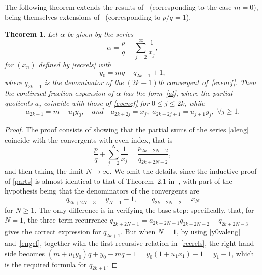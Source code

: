\documentclass[10pt, a4paper]{amsart}
\numberwithin{equation}{section}
\newcommand\al{{\alpha}}
\theoremstyle{plain}
\newtheorem{thm}{Theorem}[section]
\theoremstyle{definition}
\begin{document}
The following theorem extends the results of~\cite{Hone3} (corresponding to the case $m=0$), 
being themselves extensions of~\cite{Hone1} (corresponding to $p/q=1$). 

\begin{thm} 
\label{engelthm}
Let $\al$ be given by the series  
\begin{equation} 
\label{aleng} 
\al = \frac{p}{q}+\sum_{j=2}^\infty \frac{1}{x_j}, 
\end{equation} 
for $(x_n)$ defined by \eqref{recrels} with 
\begin{equation}
\label{y0valeng}
y_0=mq+q_{2k-1}+1, 
\end{equation} 
where $q_{2k-1}$ is the denominator of the $(2k-1)$th convergent of~\eqref{evencf}. 
Then the continued fraction expansion of $\al$ has the form~\eqref{al}, 
where the partial quotients $a_j$ coincide with those of 
\eqref{evencf} for $0\leq j\leq 2k$, while  
\begin{equation}
\label{engcf}
a_{2k+1}=m+u_1 y_0, \quad and \quad
a_{2k+2j}=x_j, \, \, a_{2k+2j+1}=u_{j+1}y_j, \,\, 
\forall j\geq 1.
\end{equation} 
\end{thm} 

\begin{proof} 
The proof  consists of showing that the partial sums of the series \eqref{aleng} 
coincide with the convergents with even index, that is 
\begin{equation}
\label{parts} 
\frac{p}{q}+\sum_{j=2}^{N}\frac{1}{x_j} = \frac{p_{2k+2N-2}}{q_{2k+2N-2}}, 
\end{equation}
and then taking the limit $N\to\infty$. We omit the details, 
since the inductive proof of \eqref{parts} %
is almost identical to that of Theorem~2.1 
in~\cite{Hone3}, with part of the %
hypothesis being that the denominators 
of the convergents are %
\begin{equation}
\label{cvgtseng} 
q_{2k+2N-3}=y_{N-1}-1, \qquad q_{2k+2N-2}=x_N
\end{equation}  
for $N\geq 1$.  The only difference is in verifying the base step: 
specifically, %
that, for $N=1$, the three-term recurrence 
$q_{2k+2N-1} = a_{2k+2N-1}q_{2k+2N-2} + q_{2k+2N-3}$ 
gives the correct expression for $q_{2k+1}$. But when $N=1$, 
by using \eqref{y0valeng} and~\eqref{engcf}, together with the first recursive 
relation in~\eqref{recrels}, 
the right-hand side %
becomes 
$(m+u_1 y_0)q+ y_0 - mq-1 = y_0(1+u_1x_1)-1=y_1-1$,
which is the required formula for $q_{2k+1}$. 
\end{proof} 
\end{document}

